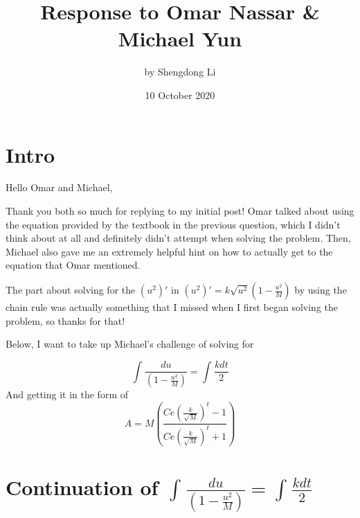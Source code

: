 \documentclass[12pt]{article}
\begin{document}
\title{Response to Omar Nassar \& Michael Yun}
\author{by Shengdong Li}
\date{10 October 2020}
\maketitle

\section{Intro}
Hello Omar and Michael,

Thank you both so much for replying to my initial post! Omar talked about using the equation provided by the textbook in the previous question, which I didn't think about at all and definitely didn't attempt when solving the problem. Then, Michael also gave me an extremely helpful hint on how to actually get to the equation that Omar mentioned.

The part about solving for the $\left(u^{2}\right)'$ in $\left(u^{2}\right)'=k\sqrt{u^{2}}\left(1-\frac{u^{2}}{M}\right)$ by using the chain rule was actually something that I missed when I first began solving the problem, so thanks for that!

Below, I want to take up Michael's challenge of solving for

$$
  \int_{ }^{ }\frac{du}{\left(1-\frac{u^{2}}{M}\right)}=\int_{ }^{ }\frac{kdt}{2}
$$
And getting it in the form of
$$
  A=M\left(\frac{Ce\left(\frac{k}{\sqrt{M}}\right)^{t}-1}{Ce\left(\frac{k}{\sqrt{M}}\right)^{t}+1}\right)
$$

\section{Continuation of \texorpdfstring{$\int_{ }^{ }\frac{du}{\left(1-\frac{u^{2}}{M}\right)}=\int_{ }^{ }\frac{kdt}{2}$}{Lg}}
\end{document}
